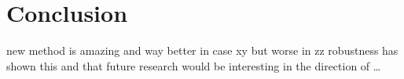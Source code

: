 \chapter{Conclusion}
	new method is amazing and way better in case xy but worse in zz
    robustness has shown this and that
    future research would be interesting in the direction of \ldots
